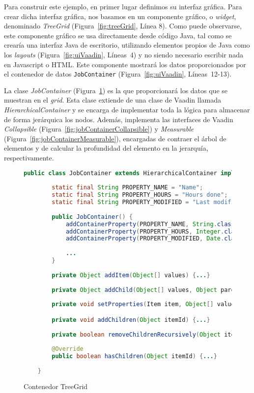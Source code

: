Para construir este ejemplo, en primer lugar definimos su interfaz gráfica. Para crear dicha interfaz gráfica, nos basamos en un componente gráfico, o \emph{widget}, denominado \emph{TreeGrid}  (Figura~\ref{fig:treeGrid}, Línea 8). Como puede observarse, este componente gráfico se usa directamente desde código Java, tal como se crearía una interfaz Java de escritorio, utilizando elementos propios de Java como los \emph{layouts} (Figura~\ref{fig:uiVaadin}, Líneas~4) y no siendo necesario escribir nada en Javascript o HTML. Este componente mostrará los datos proporcionados por el contenedor de datos \texttt{JobContainer} (Figura~\ref{fig:uiVaadin}, Líneas~12-13).


La clase \emph{JobContainer} (Figura~\ref{fig:jobContainer}) es la que proporcionará
los datos que se muestran en el \emph{grid}. Esta clase extiende de una clase de Vaadin llamada \emph{HierarchicalContainer} y se encarga de implementar toda la lógica para almacenar de forma jerárquica los nodos. Además, implementa las interfaces de Vaadin \emph{Collapsible} (Figura~\ref{fig:jobContainerCollapsible}) y \emph{Measurable} (Figura~\ref{fig:jobContainerMeasurable}), encargadas de contraer el árbol de elementos y de calcular la profundidad del elemento en la jerarquía, respectivamente.

\begin{figure}[!tb]
	\centering
	\begin{lstlisting}[language=Java]
	public class JobContainer extends HierarchicalContainer implements Collapsible, Measurable {
	
		static final String PROPERTY_NAME = "Name";
		static final String PROPERTY_HOURS = "Hours done";
		static final String PROPERTY_MODIFIED = "Last modified";
		
		public JobContainer() {
			addContainerProperty(PROPERTY_NAME, String.class, "");
			addContainerProperty(PROPERTY_HOURS, Integer.class, 0);
			addContainerProperty(PROPERTY_MODIFIED, Date.class, new Date());
			
			...	
		}
		
		private Object addItem(Object[] values) {...}
		
		private Object addChild(Object[] values, Object parentId) {...}
		
		private void setProperties(Item item, Object[] values) {...}

		private void addChildren(Object itemId) {...}
		
		private boolean removeChildrenRecursively(Object itemId) {...}
		
		@Override
		public boolean hasChildren(Object itemId) {...}
		
	}\end{lstlisting}
	\caption{Contenedor TreeGrid}
	\label{fig:jobContainer}
\end{figure}


